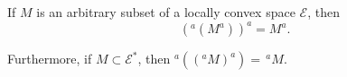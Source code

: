 If $M$ is an arbitrary subset of a locally convex space $\mathcal{E}$, then
$$(^a(M^a))^a = M^a.$$

Furthermore, if $M \subset \mathcal{E}^*$, then $^a((^a M)^a) = \,^a M$.
